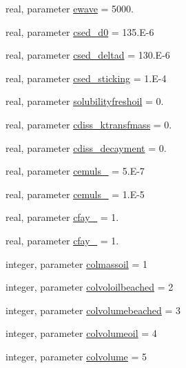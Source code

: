 \begin{DoxyCompactItemize}
\item 
real, parameter \mbox{\hyperlink{namespacemoduleoil__0d_a35671174ac62a58afd6e806218d5dada}{ewave}} = 5000.
\item 
real, parameter \mbox{\hyperlink{namespacemoduleoil__0d_a57eeca412e82f0e98144ff9a97df5c74}{csed\+\_\+d0}} = 135.\+E-\/6
\item 
real, parameter \mbox{\hyperlink{namespacemoduleoil__0d_a1b21708096f1e93fbd65c07f072fda0f}{csed\+\_\+deltad}} = 130.\+E-\/6
\item 
real, parameter \mbox{\hyperlink{namespacemoduleoil__0d_aece02e045692a0b555549d5264b8354e}{csed\+\_\+sticking}} = 1.\+E-\/4
\item 
real, parameter \mbox{\hyperlink{namespacemoduleoil__0d_ab5235c8e862a94b78772c20b7a00d3b3}{solubilityfreshoil}} = 0.
\item 
real, parameter \mbox{\hyperlink{namespacemoduleoil__0d_a185606fb84723e999c8e1cfca9fe1671}{cdiss\+\_\+ktransfmass}} = 0.
\item 
real, parameter \mbox{\hyperlink{namespacemoduleoil__0d_a2e86f60430f1b8b8d2154ec1e5ec53d4}{cdiss\+\_\+decayment}} = 0.
\item 
real, parameter \mbox{\hyperlink{namespacemoduleoil__0d_aac1290068afac9241731a6f2a55925a3}{cemuls\+\_}} = 5.\+E-\/7
\item 
real, parameter \mbox{\hyperlink{namespacemoduleoil__0d_ab77148bf270daa279217f0d363ff23c8}{cemuls\+\_}} = 1.\+E-\/5
\item 
real, parameter \mbox{\hyperlink{namespacemoduleoil__0d_af7172aa7a98c670fbebbe27b5bcb77ef}{cfay\+\_}} = 1.
\item 
real, parameter \mbox{\hyperlink{namespacemoduleoil__0d_a5b328ed2e75a4422dec170f56308b197}{cfay\+\_}} = 1.
\item 
integer, parameter \mbox{\hyperlink{namespacemoduleoil__0d_af795acf4a49e1f3e4bf2ee9271828e2a}{colmassoil}} = 1
\item 
integer, parameter \mbox{\hyperlink{namespacemoduleoil__0d_aa5bb72fac4bf1e73d8e2caea25e5f2a4}{colvoloilbeached}} = 2
\item 
integer, parameter \mbox{\hyperlink{namespacemoduleoil__0d_a06f64ceb8a0d28323a220ffcae113757}{colvolumebeached}} = 3
\item 
integer, parameter \mbox{\hyperlink{namespacemoduleoil__0d_ab7ecfed21e75bfa5133463c5decf799c}{colvolumeoil}} = 4
\item 
integer, parameter \mbox{\hyperlink{namespacemoduleoil__0d_ad525ad382949ff29ea3a012e8f1b5062}{colvolume}} = 5

\end{DoxyCompactItemize}
